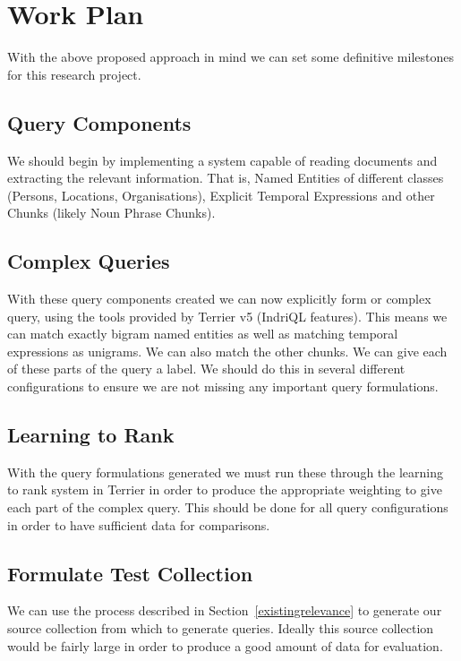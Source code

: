 \documentclass{mprop}
\begin{document}
\section{Work Plan} \label{work_plan}
With the above proposed approach in mind we can set some definitive milestones for this research project.

\subsection{Query Components}
We should begin by implementing a system capable of reading documents and extracting the relevant information. That is, Named Entities of different classes (Persons, Locations, Organisations), Explicit Temporal Expressions and other Chunks (likely Noun Phrase Chunks).

\subsection{Complex Queries}
With these query components created we can now explicitly form or complex query, using the tools provided by Terrier v5 (IndriQL features). This means we can match exactly bigram named entities as well as matching temporal expressions as unigrams. We can also match the other chunks. We can give each of these parts of the query a label. We should do this in several different configurations to ensure we are not missing any important query formulations.

\subsection{Learning to Rank}
With the query formulations generated we must run these through the learning to rank system in Terrier in order to produce the appropriate weighting to give each part of the complex query. This should be done for all query configurations in order to have sufficient data for comparisons.

\subsection{Formulate Test Collection}
We can use the process described in Section~\ref{existingrelevance} to generate our source collection from which to generate queries. Ideally this source collection would be fairly large in order to produce a good amount of data for evaluation.
\end{document}
